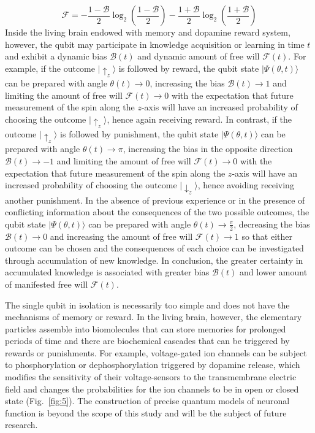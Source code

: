 \documentclass{ws-ijmpb}
\begin{document}
\begin{example}
\begin{equation}
\mathscr{F}=-\frac{1-\mathscr{B}}{2}\log_{2}\left(\frac{1-\mathscr{B}}{2}\right)-\frac{1+\mathscr{B}}{2}\log_{2}\left(\frac{1+\mathscr{B}}{2}\right)
\end{equation}
Inside the living brain endowed with memory and dopamine reward system,
however, the qubit may participate in knowledge acquisition or learning
in time $t$ and exhibit a dynamic bias $\mathscr{B}(t)$ and dynamic
amount of free will $\mathscr{F}(t)$. For example, if the outcome
$|\uparrow_{z}\rangle$ is followed by reward, the qubit state $|\Psi(\theta,t)\rangle$
can be prepared with angle $\theta(t)\to0$, increasing the bias $\mathscr{B}(t)\to1$
and limiting the amount of free will $\mathscr{F}(t)\to0$ with the
expectation that future measurement of the spin along the $z$-axis
will have an increased probability of choosing the outcome $|\uparrow_{z}\rangle$,
hence again receiving reward. In contrast, if the outcome $|\uparrow_{z}\rangle$
is followed by punishment, the qubit state $|\Psi(\theta,t)\rangle$
can be prepared with angle $\theta(t)\to\pi$, increasing the bias
in the opposite direction $\mathscr{B}(t)\to-1$ and limiting the
amount of free will $\mathscr{F}(t)\to0$ with the expectation that
future measurement of the spin along the $z$-axis will have an increased
probability of choosing the outcome $|\downarrow_{z}\rangle$, hence
avoiding receiving another punishment. In the absence of previous
experience or in the presence of conflicting information about the
consequences of the two possible outcomes, the qubit state $|\Psi(\theta,t)\rangle$
can be prepared with angle $\theta(t)\to\frac{\pi}{2}$, decreasing
the bias $\mathscr{B}(t)\to0$ and increasing the amount of free will
$\mathscr{F}(t)\to1$ so that either outcome can be chosen and the
consequences of each choice can be investigated through accumulation
of new knowledge. In conclusion, the greater certainty in accumulated
knowledge is associated with greater bias $\mathscr{B}(t)$ and lower
amount of manifested free will $\mathscr{F}(t)$.
\end{example}

The single qubit in isolation is necessarily too simple and does not
have the mechanisms of memory or reward. In the living brain, however,
the elementary particles assemble into biomolecules that can store
memories for prolonged periods of time and there are biochemical cascades
that can be triggered by rewards or punishments. For example, voltage-gated
ion channels can be subject to phosphorylation or dephosphorylation
triggered by dopamine release, which modifies the sensitivity of their
voltage-sensors to the transmembrane electric field and changes the
probabilities for the ion channels to be in open or closed state (Fig.~\ref{fig:5}).
The construction of precise quantum models of neuronal function is
beyond the scope of this study and will be the subject of future research.
\end{document}
